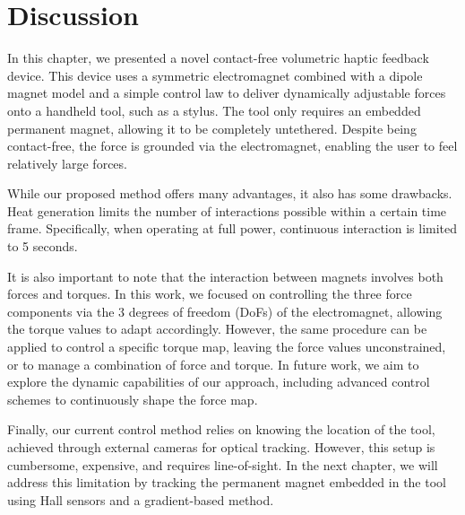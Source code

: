 
\section{Discussion}
In this chapter, we presented a novel contact-free volumetric haptic feedback device. This device uses a symmetric electromagnet combined with a dipole magnet model and a simple control law to deliver dynamically adjustable forces onto a handheld tool, such as a stylus. The tool only requires an embedded permanent magnet, allowing it to be completely untethered. Despite being contact-free, the force is grounded via the electromagnet, enabling the user to feel relatively large forces.

While our proposed method offers many advantages, it also has some drawbacks. Heat generation limits the number of interactions possible within a certain time frame. Specifically, when operating at full power, continuous interaction is limited to 5 seconds.

It is also important to note that the interaction between magnets involves both forces and torques. In this work, we focused on controlling the three force components via the 3 degrees of freedom (DoFs) of the electromagnet, allowing the torque values to adapt accordingly. However, the same procedure can be applied to control a specific torque map, leaving the force values unconstrained, or to manage a combination of force and torque. In future work, we aim to explore the dynamic capabilities of our approach, including advanced control schemes to continuously shape the force map.

Finally, our current control method relies on knowing the location of the tool, achieved through external cameras for optical tracking. However, this setup is cumbersome, expensive, and requires line-of-sight. In the next chapter, we will address this limitation by tracking the permanent magnet embedded in the tool using Hall sensors and a gradient-based method.